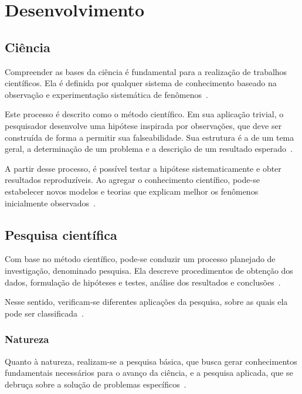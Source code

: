 \section{Desenvolvimento}%
\label{sec:desenvolvimento}

\subsection{Ciência}

Compreender as bases da ciência é fundamental para a realização de trabalhos científicos.
Ela é definida por qualquer sistema de conhecimento baseado na observação e experimentação sistemática de fenômenos~\cite{britannica_2024_science}.

Este processo é descrito como o método científico.
Em sua aplicação trivial, o pesquisador desenvolve uma hipótese inspirada por observações, que deve ser construída de forma a permitir sua falseabilidade.
Sua estrutura é a de um tema geral, a determinação de um problema e a descrição de um resultado esperado~\cite{liamara_pesquisa}.

A partir desse processo, é possível testar a hipótese sistematicamente e obter resultados reproduzíveis.
Ao agregar o conhecimento científico, pode-se estabelecer novos modelos e teorias que explicam melhor os fenômenos inicialmente observados~\cite{britannica_2024_scientific_method}.

\subsection{Pesquisa científica}

Com base no método científico, pode-se conduzir um processo planejado de investigação, denominado pesquisa.
Ela descreve procedimentos de obtenção dos dados, formulação de hipóteses e testes, análise dos resultados e conclusões~\cite{erol_2017_conduct}.

Nesse sentido, verificam-se diferentes aplicações da pesquisa, sobre as quais ela pode ser classificada~\cite{liamara_pesquisa,gil_2002_projetos}.

\subsubsection{Natureza}

Quanto à natureza, realizam-se a pesquisa básica, que busca gerar conhecimentos fundamentais necessários para o avanço da ciência, e a pesquisa aplicada, que se debruça sobre a solução de problemas específicos~\cite{liamara_pesquisa}.

